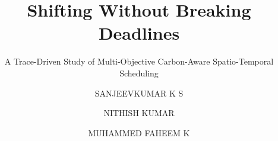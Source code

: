 \documentclass[sigconf,nonacm]{acmart}
\begin{document}
\title{Shifting Without Breaking Deadlines}
\subtitle{A Trace-Driven Study of Multi-Objective Carbon-Aware Spatio-Temporal Scheduling}

\author{SANJEEVKUMAR K S}
\author{NITHISH KUMAR}
\author{MUHAMMED FAHEEM K}



\maketitle









\end{document}
